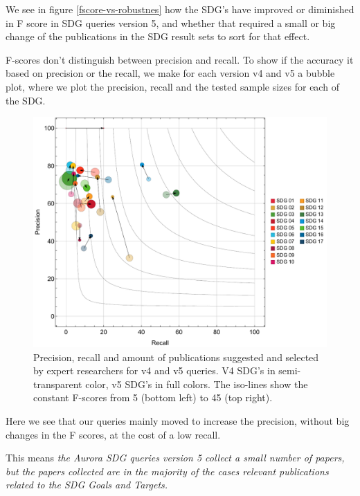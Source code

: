 \documentclass{article}
\begin{document}
We see in figure \ref{fscore-vs-robustnes} how the SDG's have improved or diminished in F score in SDG queries version 5, and whether that required a small or big change of the publications in the SDG result sets to sort for that effect.

F-scores don't distinguish between precision and recall. To show if the accuracy it based on precision or the recall, we make for each version v4 and v5 a bubble plot, where we plot the precision, recall and the tested sample sizes for each of the SDG. 



\begin{figure}[H]
	\centering
  \includegraphics[width=\textwidth]{figures/bubblechart2.pdf}
	\caption{Precision, recall and amount of publications suggested and selected by expert researchers for v4 and v5 queries. V4 SDG's in semi-transparent color, v5 SDG's in full colors. The iso-lines show the constant F-scores from 5 (bottom left) to 45 (top right). }
	\label{bubblechart}
\end{figure}

Here we see that our queries mainly moved to increase the precision, without big changes in the F scores, at the cost of a low recall. 

This means \emph{the Aurora SDG queries version 5 collect a small number of papers, but the papers collected are in the majority of the cases relevant publications related to the SDG Goals and Targets.}
\end{document}
